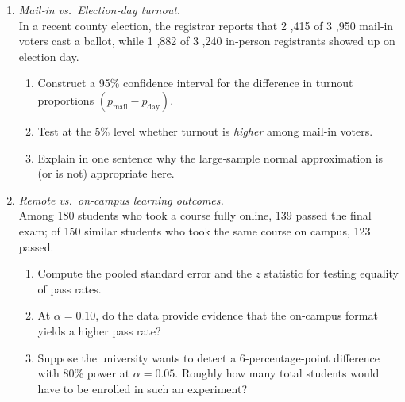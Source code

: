 \documentclass[11pt]{article}
\begin{document}
\begin{enumerate}[label=\textbf{Q\,\arabic*:}, start=11, left=0pt]

\item  \emph{Mail‑in vs.\ Election‑day turnout.} \\
      In a recent county election, the registrar reports that 2 ,415 of 3 ,950 mail‑in voters cast a ballot, while
      1 ,882 of 3 ,240 in‑person registrants showed up on election day.
      \begin{enumerate}[label=(\alph*)]
          \item Construct a 95\% confidence interval for the difference in turnout proportions $(p_{\text{mail}}-p_{\text{day}})$.  
          \item Test at the 5\% level whether turnout is \emph{higher} among mail‑in voters.  
          \item Explain in one sentence why the large‑sample normal approximation is (or is not) appropriate here.
      \end{enumerate}

\item  \emph{Remote vs.\ on‑campus learning outcomes.} \\
      Among 180 students who took a course fully online, 139 passed the final exam;  
      of 150 similar students who took the same course on campus, 123 passed.
      \begin{enumerate}[label=(\alph*)]
          \item Compute the pooled standard error and the $z$ statistic for testing equality of pass rates.  
          \item At $\alpha=0.10$, do the data provide evidence that the on‑campus format yields a higher pass rate?  
          \item Suppose the university wants to detect a 6‑percentage‑point difference with 80\% power at $\alpha=0.05$.  Roughly how many total students would have to be enrolled in such an experiment?
      \end{enumerate}


\end{enumerate}
\end{document}
